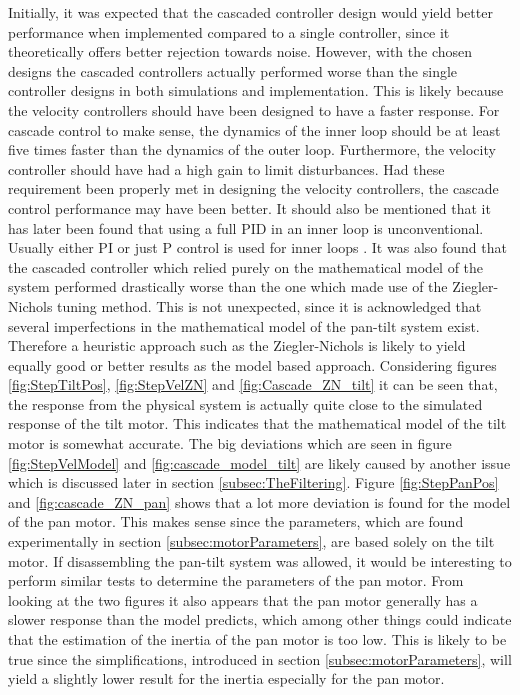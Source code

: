\documentclass[../../main.tex]{subfiles}
\begin{document}
Initially, it was expected that the cascaded controller design would yield better performance when implemented compared to a single controller, since it theoretically offers better rejection towards noise. However, with the chosen designs the cascaded controllers actually performed worse than the single controller designs in both simulations and implementation. This is likely because the velocity controllers should have been designed to have a faster response. For cascade control to make sense, the dynamics of the inner loop should be at least five times faster than the dynamics of the outer loop. Furthermore, the velocity controller should have had a high gain to limit disturbances. Had these requirement been properly met in designing the velocity controllers, the cascade control performance may have been better. It should also be mentioned that it has later been found that using a full PID in an inner loop is unconventional. Usually either PI or just P control is used for inner loops \cite{}.
It was also found that the cascaded controller which relied purely on the mathematical model of the system performed drastically worse than the one which made use of the Ziegler-Nichols tuning method. This is not unexpected, since it is acknowledged that several imperfections in the mathematical model of the pan-tilt system exist. Therefore a heuristic approach such as the Ziegler-Nichols is likely to yield equally good or better results as the model based approach. Considering figures \ref{fig:StepTiltPos}, \ref{fig:StepVelZN} and \ref{fig:Cascade_ZN_tilt} it can be seen that, the response from the physical system is actually quite close to the simulated response of the tilt motor. This indicates that the mathematical model of the tilt motor is somewhat accurate. The big deviations which are seen in figure \ref{fig:StepVelModel} and \ref{fig:cascade_model_tilt} are likely caused by another issue which is discussed later in section \ref{subsec:TheFiltering}. Figure \ref{fig:StepPanPos} and \ref{fig:cascade_ZN_pan} shows that a lot more deviation is found for the model of the pan motor. This makes sense since the parameters, which are found experimentally in section \ref{subsec:motorParameters}, are based solely on the tilt motor. If disassembling the pan-tilt system was allowed, it would be interesting to perform similar tests to determine the parameters of the pan motor. From looking at the two figures it also appears that the pan motor generally has a slower response than the model predicts, which among other things could indicate that the estimation of the inertia of the pan motor is too low. This is likely to be true since the simplifications, introduced in section \ref{subsec:motorParameters}, will yield a slightly lower result for the inertia especially for the pan motor.
\end{document}
